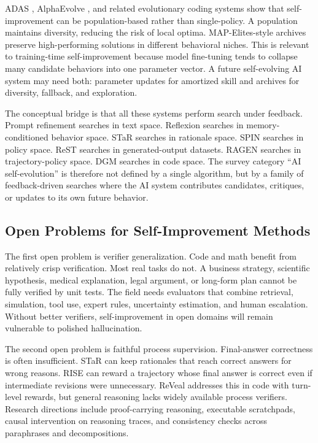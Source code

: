 ADAS \cite{hu2024automated}, AlphaEvolve \cite{novikov2025alphaevolve}, and related evolutionary coding systems show that self-improvement can be population-based rather than single-policy. A population maintains diversity, reducing the risk of local optima. MAP-Elites-style archives preserve high-performing solutions in different behavioral niches. This is relevant to training-time self-improvement because model fine-tuning tends to collapse many candidate behaviors into one parameter vector. A future self-evolving AI system may need both: parameter updates for amortized skill and archives for diversity, fallback, and exploration.

The conceptual bridge is that all these systems perform search under feedback. Prompt refinement searches in text space. Reflexion searches in memory-conditioned behavior space. STaR searches in rationale space. SPIN searches in policy space. ReST searches in generated-output datasets. RAGEN searches in trajectory-policy space. DGM searches in code space. The survey category ``AI self-evolution'' is therefore not defined by a single algorithm, but by a family of feedback-driven searches where the AI system contributes candidates, critiques, or updates to its own future behavior.

\subsection{Open Problems for Self-Improvement Methods}
\label{subsec:open-problems-methods}

The first open problem is verifier generalization. Code and math benefit from relatively crisp verification. Most real tasks do not. A business strategy, scientific hypothesis, medical explanation, legal argument, or long-form plan cannot be fully verified by unit tests. The field needs evaluators that combine retrieval, simulation, tool use, expert rules, uncertainty estimation, and human escalation. Without better verifiers, self-improvement in open domains will remain vulnerable to polished hallucination.

The second open problem is faithful process supervision. Final-answer correctness is often insufficient. STaR can keep rationales that reach correct answers for wrong reasons. RISE can reward a trajectory whose final answer is correct even if intermediate revisions were unnecessary. ReVeal addresses this in code with turn-level rewards, but general reasoning lacks widely available process verifiers. Research directions include proof-carrying reasoning, executable scratchpads, causal intervention on reasoning traces, and consistency checks across paraphrases and decompositions.

